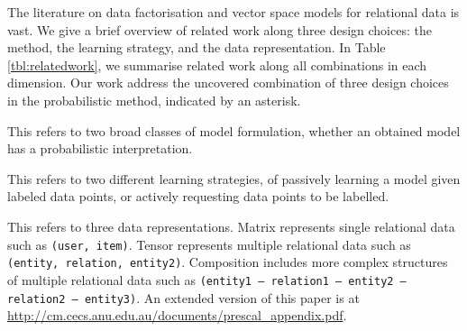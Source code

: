 
The literature on data factorisation and vector space models for
relational data is vast.
We give a brief overview of related work along three design choices:
the method, the learning strategy, and the data representation.
In Table \ref{tbl:relatedwork}, we summarise related work along all combinations in each dimension.
Our work address the uncovered combination of three design choices in the probabilistic method, indicated by an asterisk.

 This refers to two broad classes of model
formulation, whether an obtained model has a probabilistic interpretation.

 This refers to two different learning strategies,
of passively learning a model given labeled data points, or actively
requesting data points to be labelled.

 This refers to three data representations. Matrix represents single relational data such as \texttt{(user, item)}.
Tensor represents multiple relational data such as \texttt{(entity, relation, entity2)}.
Composition includes more complex structures of multiple relational data such as \texttt{(entity1 -- relation1 -- entity2 -- relation2 -- entity3)}. An extended version of this paper is at \url{http://cm.cecs.anu.edu.au/documents/prescal_appendix.pdf}.



